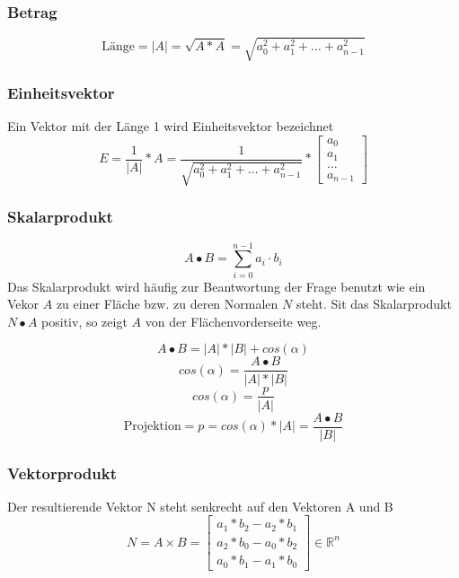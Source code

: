 \documentclass[10pt]{article}
\newcommand{\RN}{\mathbb{R}} %
\begin{document}
\subsubsection{Betrag}
\begin{equation}
	\text{Länge}=|A|=\sqrt{A * A} = \sqrt{a_0^2+a_1^2+\dots+a_{n-1}^2}
\end{equation}
\subsubsection{Einheitsvektor}
Ein Vektor mit der Länge 1 wird Einheitsvektor bezeichnet
\begin{equation}
	E =\frac{1}{|A|} * A = \frac{1}{\sqrt{a_0^2+a_1^2+\dots+a_{n-1}^2}} * 
	\begin{bmatrix}
	a_0 \\ a_1 \\ \dots \\ a_{n-1}
	\end{bmatrix}
\end{equation}
\subsubsection{Skalarprodukt}
\begin{equation}
	A \bullet B = \sum_{i=0}^{n-1} a_i \cdot b_i
\end{equation}
Das Skalarprodukt wird häufig zur Beantwortung der Frage benutzt wie ein Vekor $A$ zu einer Fläche bzw. zu deren Normalen $N$ steht. Sit das Skalarprodukt $N \bullet A$ positiv, so zeigt $A$ von der Flächenvorderseite weg.

\begin{equation}
	A \bullet B = |A| * |B| + cos(\alpha)
\end{equation}
\begin{equation}
	cos(\alpha)=\frac{A \bullet B}{|A| * |B| }
\end{equation}
\begin{equation}
	cos(\alpha)=\frac{p}{|A|}
\end{equation}
\begin{equation}
	\text{Projektion} = p=cos(\alpha) * |A| = \frac{A \bullet B}{|B|}
\end{equation}
\subsubsection{Vektorprodukt}
Der resultierende Vektor N steht senkrecht auf den Vektoren A und B
\begin{equation}
	N= A \times B =
	\begin{bmatrix}
	a_1 * b_2 - a_2 * b_1 \\
	a_2 * b_0 - a_0 * b_2 \\
	a_0 * b_1 - a_1 * b_0
	\end{bmatrix}
	\in \RN^n
\end{equation}
\end{document}
